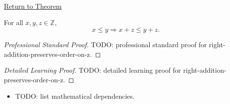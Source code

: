\newpage
{}
\label{prf:right-addition-preserves-order-on-z}

\begin{remark*}[Return]
\hyperref[cor:right-addition-preserves-order-on-z]{Return to Theorem}
\end{remark*}

\begin{corollary*}
For all $x,y,z\in\mathbb{Z}$,
\[
x\le y \Longrightarrow x+z\le y+z.
\]
\end{corollary*}

\begin{proof}[Professional Standard Proof]
\LRAProofBodyStart
TODO: professional standard proof for right-addition-preserves-order-on-z.
\end{proof}

\begin{proof}[Detailed Learning Proof]
\LRAProofBodyStart
TODO: detailed learning proof for right-addition-preserves-order-on-z.
\end{proof}

\begin{remark*}
\end{remark*}

\begin{dependencies}
\begin{itemize}
  \item TODO: list mathematical dependencies.
\end{itemize}
\end{dependencies}

\clearpage
